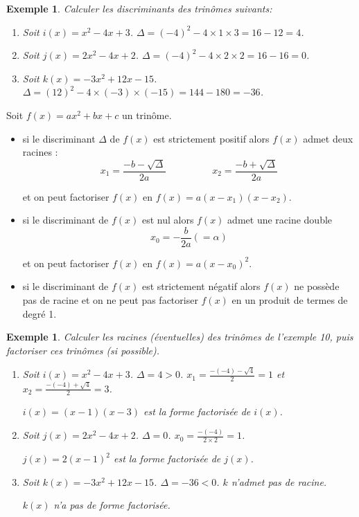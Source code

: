 \documentclass[a4paper,11pt]{article}
\theoremstyle{break}
\newcounter{enonce}
\newtheorem{exemple}[enonce]{Exemple}
\begin{document}
  \begin{exemple}
    
    Calculer les discriminants des trinômes suivants:
    \begin{enumerate}
     \item Soit $i(x)=x^2-4x+3$. $\Delta=(-4)^2-4 \times 1 \times 3=16-12=4$.
     \item Soit $j(x)=2x^2-4x+2$. $\Delta=(-4)^2-4 \times 2 \times 2=16-16=0$.
     \item Soit $k(x)=-3x^2+12x-15$. $\Delta=(12)^2-4 \times (-3) \times (-15)=144-180=-36$.
    \end{enumerate}
   \end{exemple}
  
  \begin{theorem}[Central]
    Soit $f(x)=ax^2+bx+c$ un trinôme.
    \begin{itemize}
     \item  si le discriminant $\Delta$ de $f(x)$ est strictement positif alors
     $f(x)$ admet deux racines :
     $$x_1=\frac{-b-\sqrt{\Delta}}{2a} \hspace{2cm} x_2=\frac{-b+\sqrt{\Delta}}{2a}$$
     
     et on peut factoriser $f(x)$ en $f(x)=a(x-x_1)(x-x_2)$.
     
     \item si le discriminant de $f(x)$ est nul alors $f(x)$ admet une racine double
     $$x_0=-\frac{b}{2a}(=\alpha)$$
     
     et on peut factoriser $f(x)$ en $f(x)=a(x-x_0)^2$.
     
     \item si le discriminant de $f(x)$ est strictement négatif alors
     $f(x)$ ne possède pas de racine et on ne peut pas factoriser $f(x)$ en un produit de termes de degré 1.
    \end{itemize}    
  \end{theorem}
  
  \begin{exemple}
    Calculer les racines (éventuelles) des trinômes de l'exemple 10, puis factoriser
    ces trinômes (si possible).
    
     \begin{enumerate}
     \item Soit $i(x)=x^2-4x+3$. $\Delta=4>0$. $x_1=\frac{-(-4)-\sqrt{4}}{2}=1$ et $x_2=\frac{-(-4)+\sqrt{4}}{2}=3$.
     
     $i(x)=(x-1)(x-3)$ est la forme factorisée de $i(x)$.
     \item Soit $j(x)=2x^2-4x+2$. $\Delta=0$. $x_0=\frac{-(-4)}{2 \times 2}=1$.
     
     $j(x)=2(x-1)^2$ est la forme factorisée de $j(x)$.
     \item Soit $k(x)=-3x^2+12x-15$. $\Delta=-36<0$. $k$ n'admet pas de racine.
     
     $k(x)$ n'a pas de forme factorisée.
    \end{enumerate}
   \end{exemple}
  
\end{document}
